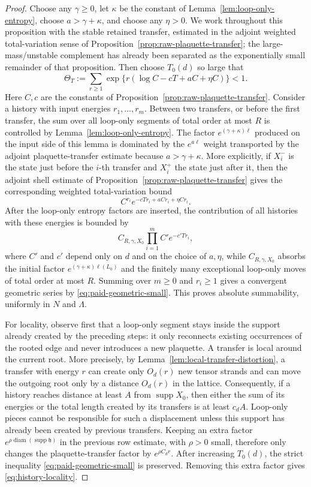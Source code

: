 \documentclass[11pt,a4paper,reqno]{amsart}
\theoremstyle{definition}
\theoremstyle{remark}
\begin{document}
\begin{proof}
Choose any $\gamma\ge0$, let $\kappa$ be the constant of Lemma~\ref{lem:loop-only-entropy}, choose $a>\gamma+\kappa$, and choose any $\eta>0$.  We work throughout this proposition with the stable retained transfer, estimated in the adjoint weighted total-variation sense of Proposition~\ref{prop:raw-plaquette-transfer}; the large-mass/unstable complement has already been separated as the exponentially small remainder of that proposition.  Then choose $T_0(d)$ so large that
\begin{equation}\label{eq:paid-geometric-small}
\Theta_T:=\sum_{r\ge1}\exp\{r(\log C-cT+aC+\eta C)\}<1.
\end{equation}
Here $C,c$ are the constants of Proposition~\ref{prop:raw-plaquette-transfer}. Consider a history with input energies $r_1,\ldots,r_m$.  Between two transfers, or before the first transfer, the sum over all loop-only segments of total order at most $R$ is controlled by Lemma~\ref{lem:loop-only-entropy}.  The factor $e^{(\gamma+\kappa)\ell}$ produced on the input side of this lemma is dominated by the $e^{a\ell}$ weight transported by the adjoint plaquette-transfer estimate because $a>\gamma+\kappa$.  More explicitly, if $X_i^-$ is the state just before the $i$-th transfer and $X_i^+$ the state just after it, then the adjoint shell estimate of Proposition~\ref{prop:raw-plaquette-transfer} gives the corresponding weighted total-variation bound
\[
C^{r_i}e^{-cTr_i+aCr_i+\eta Cr_i}.
\]
After the loop-only entropy factors are inserted, the contribution of all histories with these energies is bounded by
\[
C_{R,\gamma,X_0}
\prod_{i=1}^m C'e^{-c'Tr_i},
\]
where $C'$ and $c'$ depend only on $d$ and on the choice of $a,\eta$, while $C_{R,\gamma,X_0}$ absorbs the initial factor $e^{(\gamma+\kappa)\ell(L_0)}$ and the finitely many exceptional loop-only moves of total order at most $R$.  Summing over $m\ge0$ and $r_i\ge1$ gives a convergent geometric series by \eqref{eq:paid-geometric-small}. This proves absolute summability, uniformly in $N$ and $\Lambda$.

For locality, observe first that a loop-only segment stays inside the support already created by the preceding steps: it only reconnects existing occurrences of the rooted edge and never introduces a new plaquette.  A transfer is local around the current root.  More precisely, by Lemma~\ref{lem:local-transfer-distortion}, a transfer with energy $r$ can create only $O_d(r)$ new tensor strands and can move the outgoing root only by a distance $O_d(r)$ in the lattice.  Consequently, if a history reaches distance at least $A$ from $\operatorname{supp}X_0$, then either the sum of its energies or the total length created by its transfers is at least $c_dA$.  Loop-only pieces cannot be responsible for such a displacement unless this support has already been created by previous transfers.  Keeping an extra factor $e^{\rho\operatorname{diam}(\operatorname{supp}\mathfrak h)}$ in the previous row estimate, with $\rho>0$ small, therefore only changes the plaquette-transfer factor by $e^{\rho C_dr}$.  After increasing $T_0(d)$, the strict inequality \eqref{eq:paid-geometric-small} is preserved.  Removing this extra factor gives \eqref{eq:history-locality}.


\end{proof}
\end{document}
